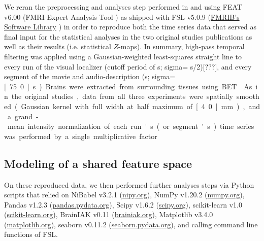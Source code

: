 %
We reran the preprocessing and analyses step performed in
\citet{sengupta2016extension} and \citet{haeusler2022processing} using FEAT
v6.00 (FMRI Expert Analysis Tool \citep{woolrich2001autocorr}) as shipped with
FSL v5.0.9 (\href{https://www.fmrib.ox.ac.uk/fsl}{FMRIB's Software Library}
\citep{smith2004fsl}) in order to reproduce both the time series data that
served as final input for the statistical analyses in the two original studies
publications as well as their results (i.e. statistical $Z$-maps).
In summary, high-pass temporal filtering was applied using a Gaussian-weighted
least-squares straight line to every run of the visual localizer (cutoff period
of \unit[100]{s}; sigma= \unit[100]{s}/2)[???], and every segment of the movie
and audio-description (\unit[150]{s}; sigma=\unit[75.0]{s}).
Brains were extracted from surrounding tissues using BET \citep{smith2002bet}.
As in the original studies, data from all three experiments were spatially
smoothed (Gaussian kernel with full width at half maximum of \unit[4.0]{mm}),
and a grand-mean intensity normalization of each run's (or segment's) time
series was performed by a single multiplicative factor.



\subsection{Modeling of a shared feature space}

On these reproduced data, we then performed further analyses steps via
Python scripts that relied on
%
NiBabel v3.2.1 (\href{https://nipy.org}{\url{nipy.org}}),
%
NumPy v1.20.2 (\href{https://numpy.org}{\url{numpy.org}}),
%
Pandas v1.2.3 (\href{https://pandas.pydata.org}{\url{pandas.pydata.org}}),
%
Scipy v1.6.2 (\href{https://scipy.org}{\url{scipy.org}}),
%
scikit-learn v1.0 (\href{https://scikit-learn.org}{\url{scikit-learn.org}}),
%
BrainIAK v0.11 (\href{https://brainiak.org}{\url{brainiak.org}}),
%
Matplotlib v3.4.0 (\href{https://matplotlib.org}{\url{matplotlib.org}}),
%
seaborn v0.11.2 (\href{https://seaborn.pydata.org}{\url{seaborn.pydata.org}}),
%
and calling command line functions of FSL.


